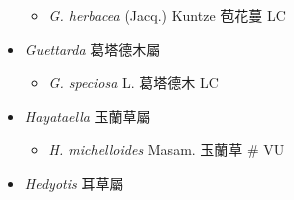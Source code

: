 \begin{itemize}
  \begin{itemize}
        \item[] \textit{G. herbacea} (Jacq.) Kuntze  苞花蔓   LC
  \end{itemize}
 \item[] \textit{Guettarda} 葛塔德木屬
                                
  \begin{itemize}
        \item[] \textit{G. speciosa} L.  葛塔德木   LC
  \end{itemize}
 \item[] \textit{Hayataella} 玉蘭草屬
                                
  \begin{itemize}
        \item[] \textit{H. michelloides} Masam.  玉蘭草  \# VU
  \end{itemize}
 \item[] \textit{Hedyotis} 耳草屬
                                

\end{itemize}
